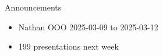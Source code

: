 \begin{frame}{Announcements}
    \begin{itemize}
        \item Nathan OOO 2025-03-09 to 2025-03-12
        \item 199 presentations next week
    \end{itemize}
\end{frame}
